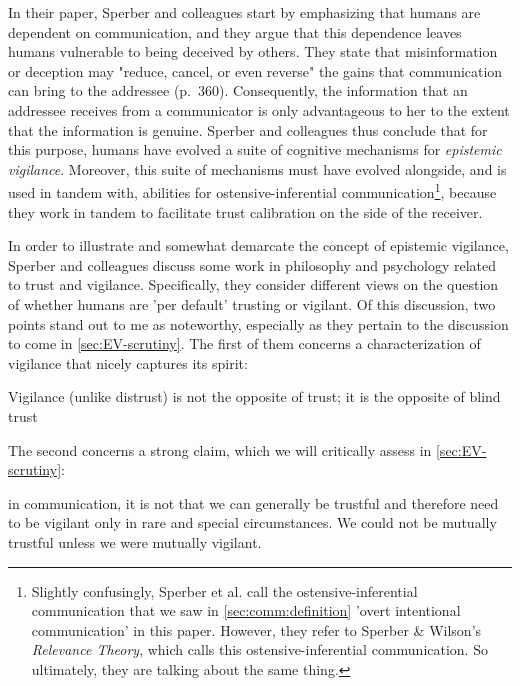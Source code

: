 In their \citeyear{Sperber10} paper, Sperber and colleagues start by emphasizing that humans are dependent on communication, and they argue that this dependence leaves humans vulnerable to being deceived by others.
They state that misinformation or deception may "reduce, cancel, or even reverse" the gains that communication can bring to the addressee (p.~360).
Consequently, the information that an addressee receives from a communicator is only advantageous to her to the extent that the information is genuine.
Sperber and colleagues thus conclude that for this purpose, humans have evolved a suite of cognitive mechanisms for \emph{epistemic vigilance}.
Moreover, this suite of mechanisms must have evolved alongside, and is used in tandem with, abilities for ostensive-inferential communication\footnote{Slightly confusingly, Sperber et al. call the ostensive-inferential communication that we saw in \cref{sec:comm:definition} 'overt intentional communication' in this paper. However, they refer to Sperber \& Wilson's \emph{Relevance Theory}, which calls this ostensive-inferential communication. So ultimately, they are talking about the same thing.}, because they work in tandem to facilitate trust calibration on the side of the receiver.

In order to illustrate and somewhat demarcate the concept of epistemic vigilance, Sperber and colleagues discuss some work in philosophy and psychology related to trust and vigilance. Specifically, they consider different views on the question of whether humans are 'per default' trusting or vigilant.
Of this discussion, two points stand out to me as noteworthy, especially as they pertain to the discussion to come in \cref{sec:EV-scrutiny}. The first of them concerns a characterization of vigilance that nicely captures its spirit:
\begin{quoting}
    Vigilance (unlike distrust) is not the opposite of trust; it is the opposite
of blind trust
    \hfill \citep[p.~363]{Sperber10}
\end{quoting}
The second concerns a strong claim, which we will critically assess in \cref{sec:EV-scrutiny}:
\begin{quoting}
    in communication, it is not that we can generally be trustful and therefore need to be vigilant only in rare and special circumstances. We could not be mutually trustful unless we were mutually vigilant.
    \hfill \citep[p.~364]{Sperber10}
\end{quoting}

